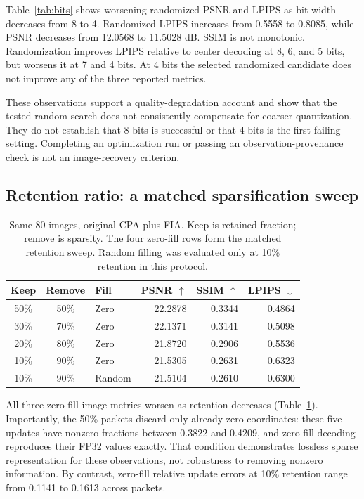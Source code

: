 \documentclass{article}
\begin{document}
Table~\ref{tab:bits} shows worsening randomized PSNR and LPIPS as bit width
decreases from 8 to 4. Randomized LPIPS increases from 0.5558 to 0.8085,
while PSNR decreases from 12.0568 to 11.5028 dB. SSIM is not monotonic.
Randomization improves LPIPS relative to center decoding at 8, 6, and
5 bits, but worsens it at 7 and 4 bits. At 4 bits the selected randomized
candidate does not improve any of the three reported metrics.

These observations support a quality-degradation account and show that
the tested random search does not consistently compensate for coarser
quantization. They do not establish that 8 bits is successful or that
4 bits is the first failing setting. Completing an optimization run or
passing an observation-provenance check is not an image-recovery criterion.

\subsection{Retention ratio: a matched sparsification sweep}
\begin{table}[t]
\centering
\caption{Same 80 images, original CPA plus FIA. Keep is retained fraction;
remove is sparsity. The four zero-fill rows form the matched retention
sweep. Random filling was evaluated only at 10\% retention in this protocol.}
\label{tab:sparse}
\small
\setlength{\tabcolsep}{3pt}
\begin{tabular}{cc l rrr}
\toprule
Keep & Remove & Fill & PSNR $\uparrow$ & SSIM $\uparrow$ & LPIPS $\downarrow$\\
\midrule
50\% & 50\% & Zero & 22.2878 & 0.3344 & 0.4864\\
30\% & 70\% & Zero & 22.1371 & 0.3141 & 0.5098\\
20\% & 80\% & Zero & 21.8720 & 0.2906 & 0.5536\\
10\% & 90\% & Zero & 21.5305 & 0.2631 & 0.6323\\
10\% & 90\% & Random & 21.5104 & 0.2610 & 0.6300\\
\bottomrule
\end{tabular}
\end{table}

All three zero-fill image metrics worsen as retention decreases
(Table~\ref{tab:sparse}). Importantly, the 50\% packets discard only
already-zero coordinates: these five updates have nonzero fractions
between 0.3822 and 0.4209, and zero-fill decoding reproduces their FP32
values exactly. That condition demonstrates lossless sparse representation
for these observations, not robustness to removing nonzero information.
By contrast, zero-fill relative update errors at 10\% retention range from
0.1141 to 0.1613 across packets.
\end{document}

